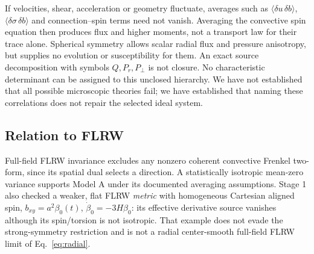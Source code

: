 If velocities, shear, acceleration or geometry fluctuate, averages such as $\langle\delta u\,\delta b\rangle$, $\langle\delta\sigma\,\delta b\rangle$ and connection--spin terms need not vanish. Averaging the convective spin equation then produces flux and higher moments, not a transport law for their trace alone. Spherical symmetry allows scalar radial flux and pressure anisotropy, but supplies no evolution or susceptibility for them. An exact source decomposition with symbols $Q,P_r,P_\perp$ is not closure. No characteristic determinant can be assigned to this unclosed hierarchy. We have not established that all possible microscopic theories fail; we have established that naming these correlations does not repair the selected ideal system.

\subsection{Relation to FLRW}
Full-field FLRW invariance excludes any nonzero coherent convective Frenkel two-form, since its spatial dual selects a direction. A statistically isotropic mean-zero variance supports Model A under its documented averaging assumptions. Stage 1 also checked a weaker, flat FLRW \emph{metric} with homogeneous Cartesian aligned spin, $b_{xy}=a^2\beta_0(t)$, $\dot\beta_0=-3H\beta_0$: its effective derivative source vanishes although its spin/torsion is not isotropic. That example does not evade the strong-symmetry restriction and is not a radial center-smooth full-field FLRW limit of Eq.~\eqref{eq:radial}.
